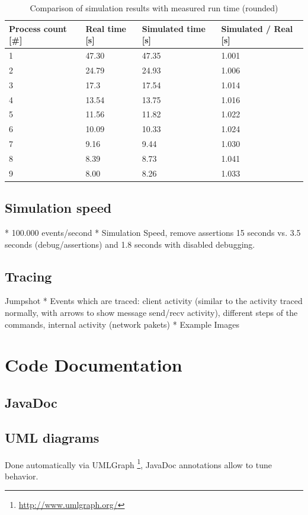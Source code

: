 \documentclass[
     11pt,         %
     a4paper,      %
     BCOR10mm,     %
     DIV14,        %
     liststotoc,   %
     bibtotoc,     %
     idxtotoc,     %
     parskip       %
     ]{scrreprt}   %
\begin{document}
\begin{table}
\begin{center}
\begin{tabular}{l||l|l|l}
Process count [\#] & Real time [s] & Simulated time [s] & Simulated / Real [s] \\
\hline
\hline
1 & 47.30 & 47.35 & 1.001 \\
2 & 24.79 & 24.93 & 1.006 \\
3 & 17.3 & 17.54 & 1.014 \\
4 & 13.54 & 13.75 & 1.016 \\
5 & 11.56 & 11.82 & 1.022 \\
6 & 10.09 & 10.33 & 1.024 \\
7 & 9.16 & 9.44 & 1.030 \\
8 & 8.39 & 8.73 & 1.041 \\
9 & 8.00 & 8.26 & 1.033
\end{tabular}
\end{center}
\caption{Comparison of simulation results with measured run time (rounded)}
\label{tbl:pde_results}
\end{table}


\subsection{Simulation speed}
* 100.000 events/second
* Simulation Speed, remove assertions 15 seconds vs. 3.5 seconds (debug/assertions) and 1.8 seconds with disabled debugging.

\subsection{Tracing}
Jumpshot
* Events which are traced: client activity (similar to the activity traced normally, with arrows to show message send/recv activity), different steps of the  commands, internal activity (network pakets)
* Example Images

\section{Code Documentation}
\subsection{JavaDoc}

\subsection{UML diagrams}
Done automatically via UMLGraph \footnote{\url{http://www.umlgraph.org/}}, JavaDoc annotations
allow to tune behavior.
\end{document}
